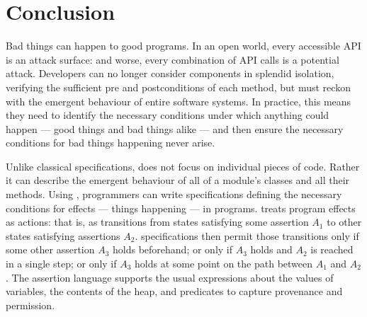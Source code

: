 \section{Conclusion}
\label{s:conclusion}

Bad things can happen to good programs. In an open world, every
accessible API is an attack surface: and worse, every combination of
API calls is a potential attack.  Developers can no longer consider
components in splendid isolation, verifying the sufficient pre and
postconditions of each method, but must reckon with the emergent
behaviour of entire software systems. In practice, this means they
need to identify the necessary conditions under which anything could
happen\cite{anything} --- good things and bad things alike --- and
then ensure the necessary conditions for bad things happening never arise.



Unlike classical specifications, \Nec does not focus on individual pieces of code.  
Rather it can describe the emergent behaviour of all of a module's
classes and all their methods.
Using \Nec,
programmers can write specifications defining the necessary
conditions for effects --- things happening --- in programs.
\Nec treats program effects as actions:
that is, as transitions from states satisfying some assertion 
$A_1$ to other states satisfying assertions $A_2$. 
\Nec specifications then permit those transitions
only if some other assertion $A_3$ holds beforehand;
or only if $A_3$ holds and $A_2$ is reached in a single step;
or only if $A_3$ holds at some point on the path between
$A_1$ and $A_2$.
The assertion language supports the usual expressions about the
values of variables, the contents of the heap, and predicates
to capture provenance and permission.

 
